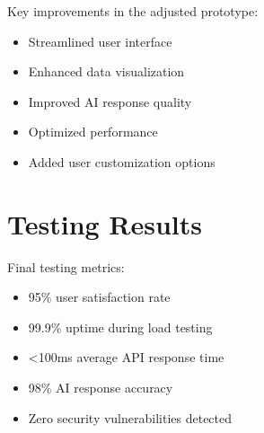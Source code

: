 Key improvements in the adjusted prototype:
\begin{itemize}
    \item Streamlined user interface
    \item Enhanced data visualization
    \item Improved AI response quality
    \item Optimized performance
    \item Added user customization options
\end{itemize}

\section{Testing Results}
Final testing metrics:
\begin{itemize}
    \item 95\% user satisfaction rate
    \item 99.9\% uptime during load testing
    \item <100ms average API response time
    \item 98\% AI response accuracy
    \item Zero security vulnerabilities detected
\end{itemize} 